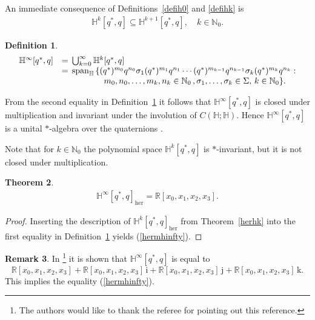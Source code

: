 \documentclass[11pt,a4paper]{amsart}
\newtheorem{theorem}{Theorem}[section]
\theoremstyle{definition}
\newtheorem{definition}[theorem]{Definition}
\newtheorem{remark}[theorem]{Remark}
\begin{document}
An immediate consequence of Definitions~\ref{defih0} and \ref{defihk} is
%
\begin{align}
\label{hkinclusion}
\mathbb{H}^{k}[q^{*},q]\subseteq \mathbb{H}^{k+1}[q^{*},q], \quad k
\in \mathbb{N}_{0}.
\end{align}
%
\begin{definition}%
\label{defihi}
%
\begin{equation*}
%
\begin{array}{r@{\quad}l}
\mathbb{H}^{\infty}[q^{*},q]&= \, \bigcup _{k=0}^{\infty}\mathbb{H}^{k}[q^{*},q]
\\
&= \, \mathrm{span}_{\mathbb{H}} \, \{ (q^{*})^{m_{0}} q^{n_{0}}
\sigma _{1}(q^{*})^{m_{1}} q^{n_{1}}\cdots (q^{*})^{m_{k-1}} q^{n_{k-1}}
\sigma _{k}(q^{*})^{m_{k}} q^{n_{k}}:
\\
& \quad \quad \quad \quad \quad m_{0},n_{0},\dots ,m_{k},n_{k}\in
\mathbb{N}_{0}\,, \sigma _{1},\dots ,\sigma _{k}\in \Sigma ,\, k\in
\mathbb{N}_{0} \}.
\end{array}
%
\end{equation*}
%
\end{definition}

From the second equality in Definition~\ref{defihi} it follows that
$\mathbb{H}^{\infty}[q^{*},q]$ is closed under multiplication and invariant
under the involution of $C(\mathbb{H};\mathbb{H})$. Hence
$\mathbb{H}^{\infty}[q^{*},q]$ is a unital $*$-algebra over the quaternions
\cite{Schmudgen2020}.

Note that for $k\in \mathbb{N}_{0}$ the polynomial space
$\mathbb{H}^{k}[q^{*},q]$ is $*$-invariant, but it is not closed under
multiplication.
%
\begin{theorem}%
\label{herinfty}
%
\begin{align}
\label{hermhinfty}
\mathbb{H}^{\infty}[q^{*},q]_{\mathrm{her}}=\mathbb{R}[x_{0},x_{1},x_{2},x_{3}].
\end{align}
%
\end{theorem}
%
\begin{proof}
Inserting the description of
$\mathbb{H}^{k}[q^{*},q]_{\mathrm{her}}$ from Theorem~\ref{herhk} into
the first equality in Definition~\ref{defihi} yields (\ref{hermhinfty}).
\end{proof}
%
\begin{remark}
\label{rem4.14}
In \cite[Subsection 1.4]{AP21}\footnote{The authors would like to thank
the referee for pointing out this reference.} it is shown that
$\mathbb{H}^{\infty}[q^{*},q]$ is equal to
%
\begin{equation*}
\mathbb{R}[x_{0},x_{1},x_{2},x_{3}]+\mathbb{R}[x_{0},x_{1},x_{2},x_{3}]
\, \mathrm{i}+\mathbb{R}[x_{0},x_{1},x_{2},x_{3}]\, \mathrm{j}+
\mathbb{R}[x_{0},x_{1},x_{2},x_{3}]\, \mathrm{k}.
\end{equation*}
%
This implies the equality (\ref{hermhinfty}).
\end{remark}
\end{document}
